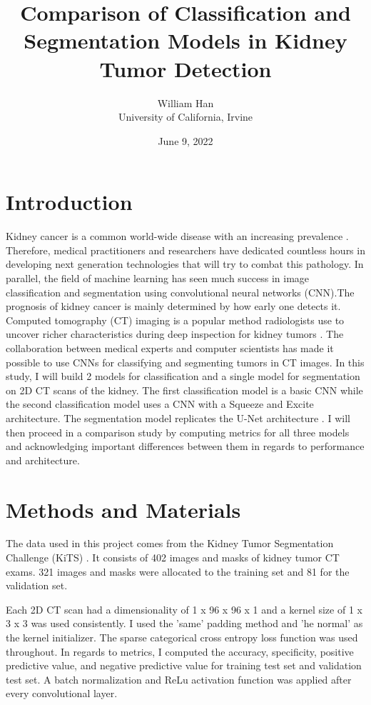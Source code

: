 \documentclass [12pt, letterpaper] {article}
\title{Comparison of Classification and Segmentation Models in Kidney Tumor Detection}
\author{William Han \\ University of California, Irvine}
\date{June 9, 2022}
\begin{document}
\maketitle

\section{Introduction}
Kidney cancer is a common world-wide disease with an increasing prevalence \cite{1}. Therefore, medical practitioners and researchers have dedicated countless hours in developing next generation technologies that will try to combat this pathology. In parallel, the field of machine learning has seen much success in image classification and segmentation using convolutional neural networks (CNN).The prognosis of kidney cancer is mainly determined by how early one detects it. Computed tomography (CT) imaging is a popular method radiologists use to uncover richer characteristics during deep inspection for kidney tumors \cite{1}. The collaboration between medical experts and computer scientists has made it possible to use CNNs for classifying and segmenting tumors in CT images. In this study, I will build 2 models for classification and a single model for segmentation on 2D CT scans of the kidney. The first classification model is a basic CNN while the second classification model uses a CNN with a Squeeze and Excite architecture. The segmentation model replicates the U-Net architecture \cite{2}. I will then proceed in a comparison study by computing metrics for all three models and acknowledging important differences between them in regards to performance and architecture. 


\section{Methods and Materials }
The data used in this project comes from the Kidney Tumor Segmentation Challenge (KiTS) \cite{1}. It consists of 402 images and masks of kidney tumor CT exams. 321 images and masks were allocated to the training set and 81 for the validation set. 

Each 2D CT scan had a dimensionality of 1 x 96 x 96 x 1 and a kernel size of 1 x 3 x 3 was used consistently. I used the 'same' padding method and 'he normal' as the kernel initializer. The sparse categorical cross entropy loss function was used throughout. In regards to metrics, I computed the accuracy, specificity, positive predictive value, and negative predictive value for training test set and validation test set. A batch normalization and ReLu activation function was applied after every convolutional layer. 
\end{document}
